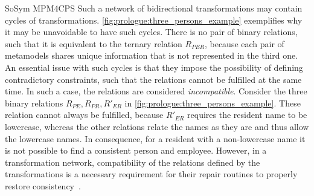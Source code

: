 \begin{copiedFrom}{SoSym MPM4CPS}
Such a network of bidirectional transformations may contain cycles of transformations.
\autoref{fig:prologue:three_persons_example} exemplifies why it may be unavoidable to have such cycles. 
There is no pair of binary relations, such that it is equivalent to the ternary relation $R_{PER}$, because each pair of metamodels shares unique information that is not represented in the third one. %
An essential issue with such cycles is that they impose the possibility of defining contradictory constraints, such that the relations cannot be fulfilled at the same time.
In such a case, the relations are considered \emph{incompatible}.
Consider the three binary relations $R_{PE}, R_{PR}, R'_{ER}$ in \autoref{fig:prologue:three_persons_example}.
These relation cannot always be fulfilled, because $R'_{ER}$ requires the resident name to be lowercase, whereas the other relations relate the names as they are and thus allow the lowercase names.
In consequence, for a resident with a non-lowercase name it is not possible to find a consistent person and employee.
However, in a transformation network, compatibility of the relations defined by the transformations is a necessary requirement for their repair routines to properly restore consistency~\cite{klare2019icmt}.


\end{copiedFrom}
